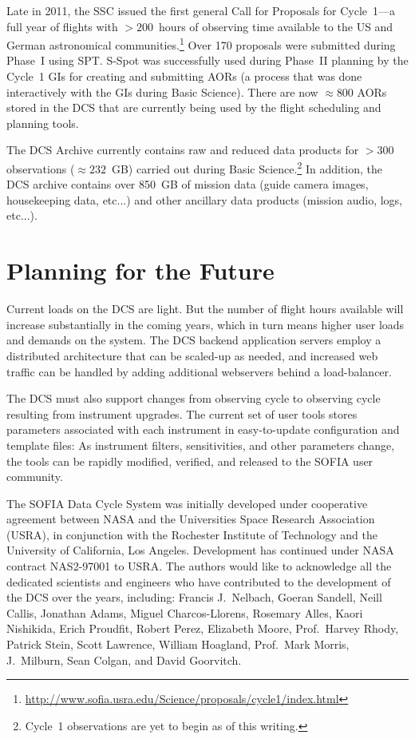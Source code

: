 \documentclass[11pt,twoside]{article}
\begin{document}
Late in 2011, the SSC issued the first general Call for Proposals for Cycle~1---a full year of flights with $> 200$~hours of observing time available to the US and German astronomical communities.\footnote{
\url{http://www.sofia.usra.edu/Science/proposals/cycle1/index.html}}
Over 170 proposals were submitted during Phase~I using SPT.  S-Spot was successfully used during Phase~II planning by the Cycle~1 GIs for creating and submitting AORs (a process that was done interactively with the GIs during Basic Science).  There are now $\approx 800$ AORs  stored in the DCS that are currently being used by the flight scheduling and planning tools.


The DCS Archive currently contains raw and reduced data products for $> 300$ observations ($\approx 232$~GB) carried out during Basic Science.\footnote{
Cycle~1 observations are yet to begin as of this writing.}  
In addition, the DCS archive contains over 850~GB of mission data (guide camera images, housekeeping data, etc...) and other ancillary data products (mission audio, logs, etc...).  

\section{Planning for the Future}

Current loads on the DCS are light.  But the number of flight hours available will increase substantially in the coming years, which in turn means higher user loads and demands on the system.  The DCS backend application servers employ a distributed architecture that can be scaled-up as needed, and increased web traffic can be handled by adding additional webservers behind a load-balancer.  

The DCS must also support changes from observing cycle to observing cycle resulting from instrument upgrades.  The current set of user tools stores parameters associated with each instrument in easy-to-update configuration and template files:  As instrument filters, sensitivities, and other parameters change, the tools can be rapidly modified, verified, and released to the SOFIA user community.  


\acknowledgements 

The SOFIA Data Cycle System was initially developed under cooperative agreement between NASA and the Universities Space Research Association (USRA), in conjunction with the Rochester Institute of Technology and the University of California, Los Angeles. Development has continued under NASA contract NAS2-97001 to USRA. The authors would like to acknowledge  all the dedicated scientists and engineers who have contributed to the development of the DCS over the years, including:  Francis J.~Nelbach, 
Goeran Sandell, 
Neill Callis, 
Jonathan Adams, 
Miguel Charcos-Llorens, 
Rosemary Alles,
Kaori Nishikida,
Erich Proudfit, 
Robert Perez,
Elizabeth Moore,
Prof.~Harvey Rhody, 
Patrick Stein,
Scott Lawrence, 
William Hoagland,
Prof.~Mark Morris, 
J.~Milburn,
Sean Colgan,
and David Goorvitch.




\end{document}
